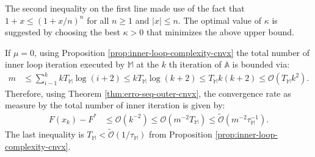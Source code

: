 \documentclass[12pt]{article}
\begin{document}
            The second inequality on the first line made use of the fact that $1 + x \le (1 + x/n)^n$ for all $n \ge 1$ and $|x| \le n$. 
            The optimal value of $\kappa$ is suggested by choosing the best $\kappa > 0$ that minimizes the above upper bound. 
            \par
            If $\mu = 0$, using Proposition \ref{prop:inner-loop-complexity-cnvx} the total number of inner loop iteration executed by $\mathbb M$ at the $k$ th iteration of $\mathbb A$ is bounded via: 
            \begin{align*}
                m &\le \sum_{i - 1}^{k} k T_{\mathbb M} \log(i + 2) \le k T_{\mathbb M} \log(k + 2) 
                \le T_{\mathbb M}k(k + 2) 
                \le 
                \mathcal O(T_{\mathbb M} k^2). 
            \end{align*}
            Therefore, using Theorem \ref{thm:erro-seq-outer-cnvx}, the convergence rate as measure by the total number of inner iteration is given by: 
            \begin{align*}
                F(x_k)- F^* &\le 
                \mathcal O(k^{-2})\le 
                \mathcal O
                    \left(
                        m^{-2}T_{\mathbb M}
                    \right) 
                    \le \widetilde{\mathcal O}
                        \left(m^{-2}\tau_{\mathbb M}^{-1}\right). 
            \end{align*}
            The last inequality is $T_{\mathbb M} < \widetilde{\mathcal O}(1/\tau_{\mathbb M})$ from Proposition \ref{prop:inner-loop-complexity-cnvx}. 
            
\end{document}
